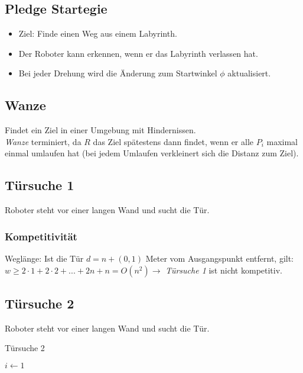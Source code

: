 \subsection{Pledge Startegie}
\begin{itemize}
	\item Ziel: Finde einen Weg aus einem Labyrinth.
	\item Der Roboter kann erkennen, wenn er das Labyrinth verlassen hat.
	\item Bei jeder Drehung wird die Änderung zum Startwinkel \(\phi\) aktualisiert.
\end{itemize}



\subsection{Wanze}
Findet ein Ziel in einer Umgebung mit Hindernissen.
\text{}\\


\textit{Wanze} terminiert, da \(R\) das Ziel spätestens dann findet, wenn er alle \(P_i\) maximal einmal umlaufen hat (bei jedem Umlaufen verkleinert sich die Distanz zum Ziel).


\subsection{Türsuche 1}
Roboter steht vor einer langen Wand und sucht die Tür.
\text{}\\



\subsubsection{Kompetitivität}
Weglänge: Ist die Tür \(d = n + (0,1)\) Meter vom Ausgangspunkt entfernt, gilt:\newline
\(w \geq 2 \cdot 1 + 2 \cdot 2 + ... + 2n +n = O(n^2) \rightarrow\) \textit{Türsuche 1} ist nicht kompetitiv.


\subsection{Türsuche 2}
Roboter steht vor einer langen Wand und sucht die Tür.

\begin{algorithm}[H]
	\caption{Türsuche 2}

	$i \longleftarrow 1$
	\BlankLine
	
\end{algorithm}

